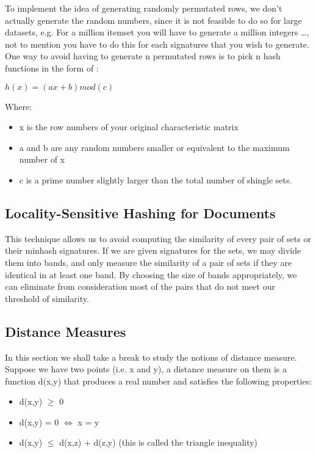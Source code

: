 \documentclass[12pt]{article}
\begin{document}
To implement the idea of generating randomly permutated rows, we don’t actually generate the random numbers, since it is not feasible to do so for large datasets, e.g. For a million itemset you will have to generate a million integers …, not to mention you have to do this for each signatures that you wish to generate. One way to avoid having to generate n permutated rows is to pick n hash functions in the form of :
\medbreak
\begin{center}
$ h(x)=(ax+b) mod(c)$
\end{center}

Where: 
\begin{itemize}
\item x is the row numbers of your original characteristic matrix
\item a and b are any random numbers smaller or equivalent to the maximum number of x 
\item c is a prime number slightly larger than the total number of shingle sets. 
\end{itemize}

\subsection{Locality-Sensitive Hashing for Documents}
 This technique allows us to avoid computing the similarity of every pair of sets or their minhash signatures. If we are given signatures for the sets, we may divide them into bands, and only measure the similarity of a pair of sets if they are identical in at least one band. By choosing the size of bands appropriately, we can eliminate from consideration most of the pairs that do not meet our threshold of similarity.
 
\subsection{Distance Measures}

In this section we shall take a break to study the notions of distance measure.
Suppose we have two points (i.e. x and y), a distance measure on them is a function d(x,y) that produces a real number and satisfies the following properties:
\begin{itemize}
\item d(x,y) $\geq$ 0 

\item d(x,y) = 0 $\iff$ x = y 

\item d(x,y) $\leq$ d(x,z) + d(z,y) (this is called the triangle inequality)
\end{itemize}
\end{document}

